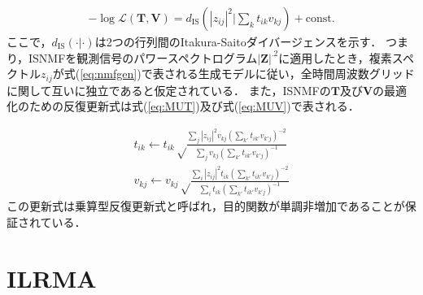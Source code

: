 \begin{align}
    -\log\mathcal{L}(\bm{T}, \bm{V}) = d_{\mathrm{IS}} \left( |z_{ij}|^2 | \sum_k t_{ik} v_{kj} \right) + \mathrm{const.}
    \label{eq:isnmf}
\end{align}
ここで，$d_{\mathrm{IS}}( \cdot | \cdot )$は2つの行列間のItakura-Saitoダイバージェンスを示す．
つまり，ISNMFを観測信号のパワースペクトログラム$|\bm{Z}|^{.2}$に適用したとき，複素スペクトル$z_{ij}$が式(\ref{eq:nmfgen})で表される生成モデルに従い，全時間周波数グリッドに関して互いに独立であると仮定されている．
また，ISNMFの$\bm{T}$及び$\bm{V}$の最適化のための反復更新式は式(\ref{eq:MUT})及び式(\ref{eq:MUV})で表される\cite{MU}．

\begin{align}
    t_{ik} \leftarrow t_{ik} \sqrt \frac{ \sum_j |z_{ij}|^2 v_{kj} \left( \sum_{k'} t_{ik'} v_{k'j} \right)^{-2} }{ \sum_j v_{kj} \left( \sum_{k'} t_{ik'} v_{k'j} \right)^{-1} } \label{eq:MUT} \\
    v_{kj} \leftarrow v_{kj} \sqrt \frac{ \sum_i |z_{ij}|^2 t_{ik} \left( \sum_{k'} t_{ik'} v_{k'j} \right)^{-2} }{ \sum_i t_{ik} \left( \sum_{k'} t_{ik'} v_{k'j} \right)^{-1} } \label{eq:MUV}
\end{align}
この更新式は乗算型反復更新式と呼ばれ，目的関数が単調非増加であることが保証されている．

\section{ILRMA}
\label{sec:conv:ilrma}

